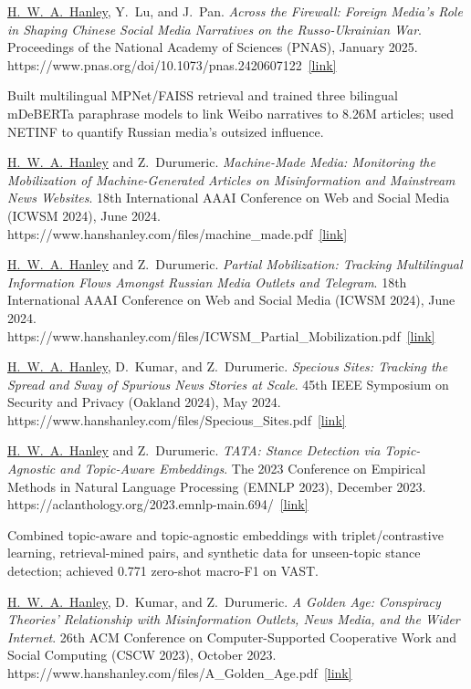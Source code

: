 \documentclass[11pt,letterpaper]{article}
\newcommand{\pub}[4]{%
  \Needspace{3\baselineskip}%
  \item #1. \textit{#2}. #3.%
  \ifx\relax#4\relax\else\ \href{#4}{\small[link]}\fi
}
\newcommand{\me}{\underline{H.~W.~A.~Hanley}}
\begin{document}
\begin{pubs}
\pub{\me{}, Y.~Lu, and J.~Pan}
    {Across the Firewall: Foreign Media's Role in Shaping Chinese Social Media Narratives on the Russo-Ukrainian War}
    {Proceedings of the National Academy of Sciences (PNAS), January 2025}
    {https://www.pnas.org/doi/10.1073/pnas.2420607122}
\begin{bullets}
  \item Built multilingual MPNet/FAISS retrieval and trained three bilingual mDeBERTa paraphrase models to link Weibo narratives to 8.26M articles; used NETINF to quantify Russian media's outsized influence.
\end{bullets}

\pub{\me{} and Z.~Durumeric}
    {Machine-Made Media: Monitoring the Mobilization of Machine-Generated Articles on Misinformation and Mainstream News Websites}
    {18th International AAAI Conference on Web and Social Media (ICWSM 2024), June 2024}
    {https://www.hanshanley.com/files/machine_made.pdf}

\pub{\me{} and Z.~Durumeric}
    {Partial Mobilization: Tracking Multilingual Information Flows Amongst Russian Media Outlets and Telegram}
    {18th International AAAI Conference on Web and Social Media (ICWSM 2024), June 2024}
    {https://www.hanshanley.com/files/ICWSM_Partial_Mobilization.pdf}

\pub{\me{}, D.~Kumar, and Z.~Durumeric}
    {Specious Sites: Tracking the Spread and Sway of Spurious News Stories at Scale}
    {45th IEEE Symposium on Security and Privacy (Oakland 2024), May 2024}
    {https://www.hanshanley.com/files/Specious_Sites.pdf}

\pub{\me{} and Z.~Durumeric}
    {TATA: Stance Detection via Topic-Agnostic and Topic-Aware Embeddings}
    {The 2023 Conference on Empirical Methods in Natural Language Processing (EMNLP 2023), December 2023}
    {https://aclanthology.org/2023.emnlp-main.694/}
\begin{bullets}
  \item Combined topic-aware and topic-agnostic embeddings with triplet/contrastive learning, retrieval-mined pairs, and synthetic data for unseen-topic stance detection; achieved 0.771 zero-shot macro-F1 on VAST.
\end{bullets}

\pub{\me{}, D.~Kumar, and Z.~Durumeric}
    {A Golden Age: Conspiracy Theories' Relationship with Misinformation Outlets, News Media, and the Wider Internet}
    {26th ACM Conference on Computer-Supported Cooperative Work and Social Computing (CSCW 2023), October 2023}
    {https://www.hanshanley.com/files/A_Golden_Age.pdf}


\end{pubs}
\end{document}
